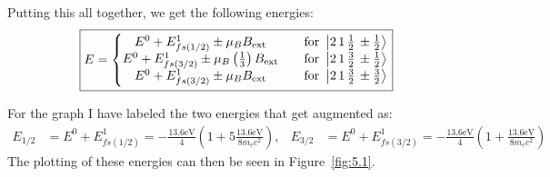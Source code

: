 \documentclass[11pt]{article}
\begin{document}
Putting this all together, we get the following energies:
\[\boxed{E = \left\{\mqty{E^0 + E^1_{fs(1/2)} \pm \mu_B B_\text{ext} & \quad \text{for } \ket{2\,1\,\frac{1}{2}\,\pm\frac{1}{2}} \\ E^0 + E^1_{fs(3/2)} \pm \mu_B \left(\frac{1}{3}\right)B_\text{ext} & \quad \text{for } \ket{2\,1\,\frac{3}{2}\,\pm\frac{1}{2}} \\ E^0 + E^1_{fs(3/2)} \pm \mu_B B_\text{ext} & \quad \text{for } \ket{2\,1\,\frac{3}{2}\,\pm\frac{3}{2}}}\right.}\]

For the graph I have labeled the two energies that get augmented as:
\begin{align*}
E_{1/2} & = E^0 + E^1_{fs(1/2)} =  -\frac{13.6 \text{eV}}{4}\left( 1 + 5\frac{13.6 \text{eV}}{8m_ec^2}\right),  & E_{3/2} &= E^0 + E^1_{fs(3/2)} = -\frac{13.6 \text{eV}}{4}\left( 1 + \frac{13.6 \text{eV}}{8m_ec^2}\right)
\end{align*}
The plotting of these energies can then be seen in Figure~\ref{fig:5.1}.
\end{document}
